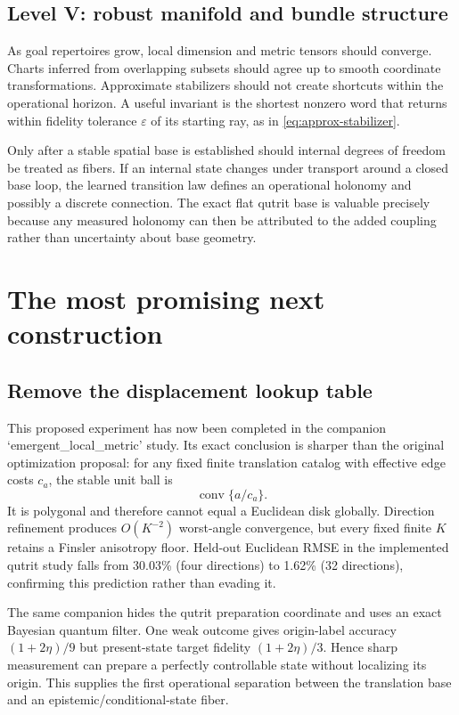 \documentclass[11pt]{article}
\theoremstyle{definition}
\theoremstyle{remark}
\begin{document}
\subsection{Level V: robust manifold and bundle structure}

As goal repertoires grow, local dimension and metric tensors should converge.
Charts inferred from overlapping subsets should agree up to smooth coordinate
transformations. Approximate stabilizers should not create shortcuts within
the operational horizon. A useful invariant is the shortest nonzero word that
returns within fidelity tolerance $\varepsilon$ of its starting ray, as in
\cref{eq:approx-stabilizer}.

Only after a stable spatial base is established should internal degrees of
freedom be treated as fibers. If an internal state changes under transport
around a closed base loop, the learned transition law defines an operational
holonomy and possibly a discrete connection. The exact flat qutrit base is
valuable precisely because any measured holonomy can then be attributed to
the added coupling rather than uncertainty about base geometry.

\section{The most promising next construction}
\label{sec:future}

\subsection{Remove the displacement lookup table}

This proposed experiment has now been completed in the companion
`emergent\_local\_metric' study.  Its exact conclusion is sharper than the
original optimization proposal: for any fixed finite translation catalog with
effective edge costs $c_a$, the stable unit ball is
\begin{equation}
 \operatorname{conv}\{a/c_a\}.
\end{equation}
It is polygonal and therefore cannot equal a Euclidean disk globally.
Direction refinement produces $O(K^{-2})$ worst-angle convergence, but every
fixed finite $K$ retains a Finsler anisotropy floor.  Held-out Euclidean RMSE
in the implemented qutrit study falls from 30.03\% (four directions) to
1.62\% (32 directions), confirming this prediction rather than evading it.

The same companion hides the qutrit preparation coordinate and uses an exact
Bayesian quantum filter.  One weak outcome gives origin-label accuracy
$(1+2\eta)/9$ but present-state target fidelity $(1+2\eta)/3$.  Hence sharp
measurement can prepare a perfectly controllable state without localizing its
origin.  This supplies the first operational separation between the
translation base and an epistemic/conditional-state fiber.
\end{document}
